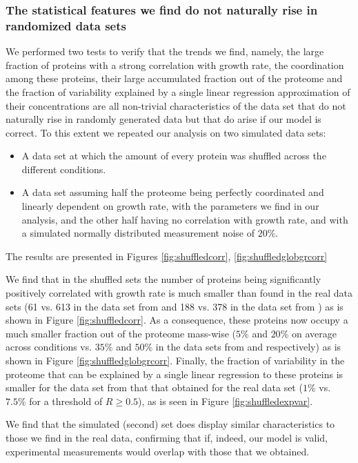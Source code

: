 \subsubsection{The statistical features we find do not naturally rise in randomized data sets}
We performed two tests to verify that the trends we find, namely, the large fraction of proteins with a strong correlation with growth rate, the coordination among these proteins, their large accumulated fraction out of the proteome and the fraction of variability explained by a single linear regression approximation of their concentrations are all non-trivial characteristics of the data set that do not naturally rise in randomly generated data but that do arise if our model is correct.
To this extent we repeated our analysis on two simulated data sets:
\begin{itemize}
\item A data set at which the amount of every protein was shuffled across the different conditions.
\item A data set assuming half the proteome being perfectly coordinated and linearly dependent on growth rate, with the parameters we find in our analysis, and the other half having no correlation with growth rate, and with a simulated normally distributed measurement noise of $20\%$.
\end{itemize}
The results are presented in Figures \ref{fig:shuffledcorr}, \ref{fig:shuffledglobgrcorr}

We find that in the shuffled sets the number of proteins being significantly positively correlated with
growth rate is much smaller than found in the real data sets (61 vs. 613 in the data set from \cite{Heinemann2015} and 188 vs. 378 in the data set from \cite{Valgepea2013}) as is shown in Figure \ref{fig:shuffledcorr}.
As a consequence, these proteins now occupy a much smaller fraction out of the proteome mass-wise ($5\%$ and $20\%$ on average across conditions vs. $35\%$ and $50\%$ in the data sets from \cite{Heinemann2015} and \cite{Valgepea2013} respectively) as is shown in Figure \ref{fig:shuffledglobgrcorr}.
Finally, the fraction of variability in the proteome that can be explained by a single linear regression to these proteins is smaller for the data set from \cite{Heinemann2015} that that obtained for the real data set ($1\%$ vs. $7.5\%$ for a threshold of $R\ge0.5$), as is seen in Figure \ref{fig:shuffledexpvar}.

We find that the simulated (second) set does display similar characteristics to those we find in the real data, confirming that if, indeed, our model is valid, experimental measurements would overlap with those that we obtained.